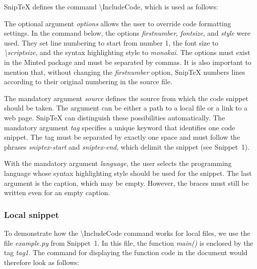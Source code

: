 \documentclass{article}
\begin{document}
Snip\TeX{} defines the command \textbackslash{}IncludeCode, which is used as follows:


The optional argument \textit{options} allows the user to override code formatting settings. 
In the command below, the options \textit{firstnumber}, \textit{fontsize}, and \textit{style} were used. 
They set line numbering to start from number 1, the font size to \nobreak\textit{\textbackslash{}scriptsize}, 
and the syntax highlighting style to \textit{monokai}. 
The options must exist in the Minted package \citep{minted} and must be separated by commas. 
It is also important to mention that, without changing the \textit{firstnumber} option, 
Snip\TeX{} numbers lines according to their original numbering in the source file.


The mandatory argument \textit{source} defines the source from which the code snippet should be taken. 
The argument can be either a path to a local file or a link to a web page. 
Snip\TeX{} can distinguish these possibilities automatically. 
The mandatory argument \textit{tag} specifies a unique keyword that identifies one code snippet. 
The tag must be separated by exactly one space and must follow the phrases \textit{sniptex-start} and \textit{sniptex-end}, 
which delimit the snippet (see Snippet~1).


With the mandatory argument \textit{language}, the user selects the programming language 
whose syntax highlighting style should be used for the snippet. 
The last argument is the caption, which may be empty. 
However, the braces must still be written even for an empty caption.

\subsubsection*{Local snippet}

To demonstrate how the \textbackslash{}IncludeCode command works for local files, 
we use the file \textit{example.py} from Snippet~1. In this file, the function \textit{main()} 
is enclosed by the tag \textit{tag1}. The command for displaying the function code in the document 
would therefore look as follows:

\end{document}
